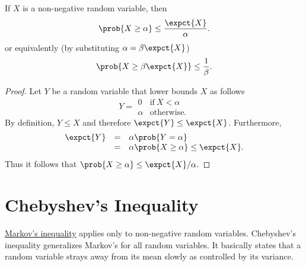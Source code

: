 
\begin{flex}
\begin{theorem}
\label{thm:probability::expectation::markov-inequality}
If $X$ is a non-negative random variable,
%
then
\[ 
\prob{X \geq \alpha} \leq \frac{\expct{X}}{\alpha}. 
\]
or equivalently (by substituting $\alpha = \beta\expct{X}$)
\[ 
\prob{X \geq \beta\expct{X}} \leq \frac{1}{\beta}.
\]
\end{theorem}

\begin{proof}
%
%
Let $Y$ be a random variable that lower bounds $X$ as follows
\[
Y = 
\begin{array}{ll}
0 & \text{if}~X < \alpha
\\
\alpha & \text{otherwise}.
\end{array} 
\]
By definition, $Y \le X$ and therefore $\expct{Y} \le \expct{X}$.
%
Furthermore, 
\[
\begin{array}{lcl}
\expct{Y} & = & \alpha \prob{Y = \alpha} \\
          & = & \alpha \prob{X \ge \alpha} \le \expct{X}. 
\end{array}
\]
Thus it follows that $\prob{X \ge \alpha} \le \expct{X} /  \alpha.$ 
\end{proof}
\end{flex}

\section{Chebyshev's Inequality}
\label{sec:probability::expectation::chebyshev}

\begin{gram}
\href{thm:probability::expectation::markov-inequality}{Markov's inequality} applies only to non-negative random variables.  Chebyshev's inequality generalizes Markov's for all random variables.  It basically states that a random variable strays away from its mean slowly as controlled by its variance.
\end{gram}

